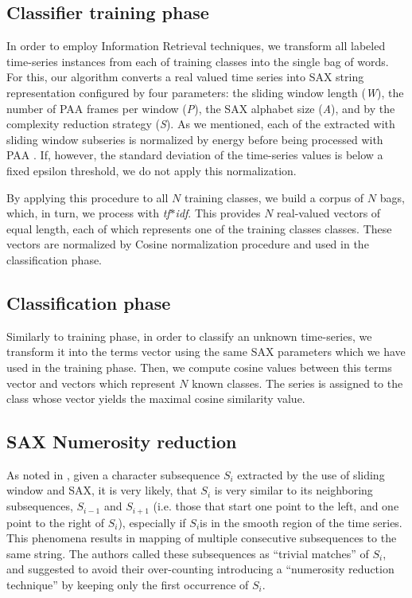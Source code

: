 \documentclass{llncs}
\begin{document}
\subsection{Classifier training phase}
In order to employ Information Retrieval techniques, we transform all labeled time-series instances
from each of training classes into the single bag of words. For this, our algorithm converts a real
valued time series into SAX string representation configured by four parameters: the sliding window
length (\textit{W}), the number of PAA frames per window (\textit{P}), the SAX alphabet size
(\textit{A}), and by the complexity reduction strategy (\textit{S}). 
As we mentioned, each of the extracted with sliding window subseries is normalized by energy before
being processed with PAA \cite{goldin_kanellakis}. If, however, the standard deviation of the
time-series values is below a fixed epsilon threshold, we do not apply this normalization.

By applying this procedure to all $N$ training classes, we build a corpus of $N$ bags, which, in
turn, we process with \textit{tf$\ast$idf}. This provides $N$ real-valued vectors of equal
length, each of which represents one of the training classes classes. These vectors are normalized
by Cosine normalization procedure and used in the classification phase.

\subsection{Classification phase}
Similarly to training phase, in order to classify an unknown time-series, we transform it into the
terms vector using the same SAX parameters which we have used in the training phase. 
Then, we compute cosine values between this terms vector and vectors which represent $N$ known
classes. The series is assigned to the class whose vector yields the maximal cosine similarity
value.

\subsection{SAX Numerosity reduction}
As noted in \cite{sax}, given a character subsequence $S_{i}$ extracted by the use of sliding
window and SAX, it is very likely, that $S_{i}$ is very similar to its neighboring subsequences,
$S_{i−1}$ and $S_{i+1}$ (i.e. those that start one point to the left, and one point to the right of
$S_{i}$), especially if $S_{i}$is in the smooth region of the time series. This phenomena results in
mapping of multiple consecutive subsequences to the same string. The authors called these
subsequences as ``trivial matches'' of $S_{i}$, and suggested to avoid their over-counting
introducing a ``numerosity reduction technique'' by keeping only the first occurrence of $S_{i}$. 
\end{document}
